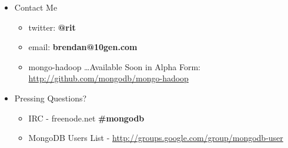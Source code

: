 \documentclass{beamer}
\newenvironment{itemizeframe}
               {\begin{frame}\startitemizeframe} 
               {\stopitemizeframe\end{frame}}
\newcommand\startitemizeframe{\begin{itemize}} \newcommand\stopitemizeframe{\end{itemize}}
\begin{document}
\begin{itemizeframe}
    \frametitle{Questions?}
    \framesubtitle{Contact Info}
    \item Contact Me
    \begin{itemize}
        \item twitter: {\bf @rit}
        \item email: {\bf brendan@10gen.com}	
		\item mongo-hadoop \ldots Available Soon in Alpha Form: \url{http://github.com/mongodb/mongo-hadoop}
    \end{itemize}
    \item Pressing Questions?
    \begin{itemize}
        \item IRC - {freenode.net \bf\#mongodb}
        \item MongoDB Users List - \url{http://groups.google.com/group/mongodb-user}
    \end{itemize}
\end{itemizeframe}
\end{document}
